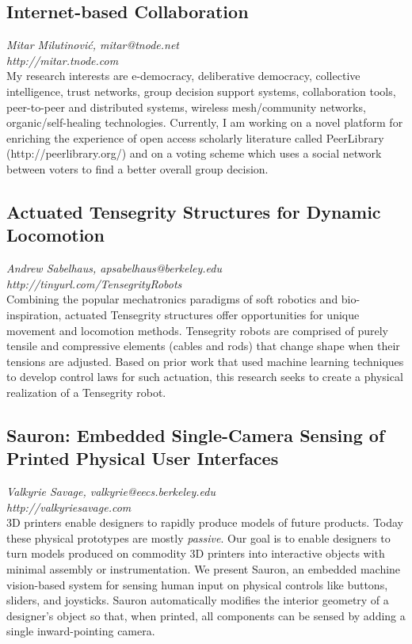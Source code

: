 \documentclass[foldmark,10pt,a4paper,notumble]{leaflet}
\begin{document}
\subsection{Internet-based Collaboration}
\emph{Mitar Milutinovi\'c, mitar@tnode.net}\\
\emph{http://mitar.tnode.com}\\
My research interests are e-democracy, deliberative democracy,
collective intelligence, trust networks, group decision support systems,
collaboration tools, peer-to-peer and distributed systems, wireless
mesh/community networks, organic/self-healing technologies. Currently, I
am working on a novel platform for enriching the experience of open
access scholarly literature called PeerLibrary (http://peerlibrary.org/)
and on a voting scheme which uses a social network between voters to
find a better overall group decision.

\subsection{Actuated Tensegrity Structures for Dynamic Locomotion}
\emph{Andrew Sabelhaus, apsabelhaus@berkeley.edu}\\
\emph{http://tinyurl.com/TensegrityRobots}\\
Combining the popular mechatronics paradigms of soft robotics and bio-inspiration, actuated Tensegrity structures offer opportunities for unique movement and locomotion methods. Tensegrity robots are comprised of purely tensile and compressive elements (cables and rods) that change shape when their tensions are adjusted. Based on prior work that used machine learning techniques to develop control laws for such actuation, this research seeks to create a physical realization of a Tensegrity robot.

\subsection{Sauron: Embedded Single-Camera Sensing of Printed Physical User Interfaces}
\emph{Valkyrie Savage, valkyrie@eecs.berkeley.edu}\\
\emph{http://valkyriesavage.com}\\
3D printers enable designers to rapidly produce models of future products.  Today these physical prototypes are mostly \emph{passive}.  Our goal is to enable designers to turn models produced on commodity 3D printers into interactive objects with minimal assembly or instrumentation.  We present Sauron, an embedded machine vision-based system for sensing human input on physical controls like buttons, sliders, and joysticks.  Sauron automatically modifies the interior geometry of a designer's object so that, when printed, all components can be sensed by adding a single inward-pointing camera.
\end{document}
